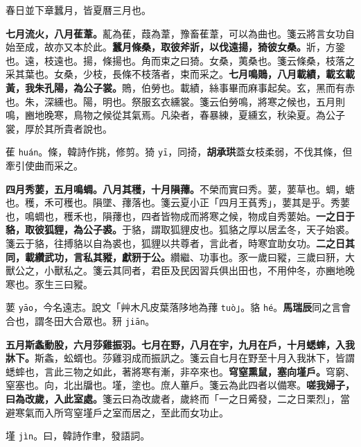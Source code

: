 \begin{quoting}春日並下章蠶月，皆夏曆三月也。\end{quoting}

\textbf{七月流火，八月萑葦。}{\footnotesize 薍為萑，葭為葦，豫畜萑葦，可以為曲也。箋云將言女功自始至成，故亦又本於此。}\textbf{蠶月條桑，取彼斧斨，以伐遠揚，猗彼女桑。}{\footnotesize 斨，方銎也。遠，枝遠也。揚，條揚也。角而束之曰猗。女桑，荑桑也。箋云條桑，枝落之采其葉也。女桑，少枝，長條不枝落者，束而采之。}\textbf{七月鳴鵙，八月載績，載玄載黃，我朱孔陽，為公子裳。}{\footnotesize 鵙，伯勞也。載績，絲事畢而麻事起矣。玄，黑而有赤也。朱，深纁也。陽，明也。祭服玄衣纁裳。箋云伯勞鳴，將寒之候也，五月則鳴，豳地晚寒，鳥物之候從其氣焉。凡染者，春暴練，夏纁玄，秋染夏。為公子裳，厚於其所貴者說也。}

\begin{quoting}萑 \texttt{huán}。條，韓詩作挑，修剪。猗 \texttt{yī}，同掎，\textbf{胡承珙}蓋女枝柔弱，不伐其條，但牽引使曲而采之。\end{quoting}

\textbf{四月秀葽，五月鳴蜩。八月其穫，十月隕蘀。}{\footnotesize 不榮而實曰秀。葽，葽草也。蜩，螗也。穫，禾可穫也。隕墜、蘀落也。箋云夏小正「四月王萯秀」，葽其是乎。秀葽也，鳴蜩也，穫禾也，隕蘀也，四者皆物成而將寒之候，物成自秀葽始。}\textbf{一之日于貉，取彼狐貍，為公子裘。}{\footnotesize 于貉，謂取狐貍皮也。狐貉之厚以居孟冬，天子始裘。箋云于貉，往搏貉以自為裘也，狐貍以共尊者，言此者，時寒宜助女功。}\textbf{二之日其同，載纘武功，言私其豵，獻豜于公。}{\footnotesize 纘繼、功事也。豕一歲曰豵，三歲曰豜，大獸公之，小獸私之。箋云其同者，君臣及民因習兵俱出田也，不用仲冬，亦豳地晚寒也。豕生三曰豵。}

\begin{quoting}葽 \texttt{yāo}，今名遠志。說文「艸木凡皮葉落陊地為蘀 \texttt{tuò}」。貉 \texttt{hé}。\textbf{馬瑞辰}同之言會合也，謂冬田大合眾也。豜 \texttt{jiān}。\end{quoting}

\textbf{五月斯螽動股，六月莎雞振羽。七月在野，八月在宇，九月在戶，十月蟋蟀，入我牀下。}{\footnotesize 斯螽，蚣蝑也。莎雞羽成而振訊之。箋云自七月在野至十月入我牀下，皆謂蟋蟀也，言此三物之如此，著將寒有漸，非卒來也。}\textbf{穹窒熏鼠，塞向墐戶。}{\footnotesize 穹窮、窒塞也。向，北出牖也。墐，塗也。庶人蓽戶。箋云為此四者以備寒。}\textbf{嗟我婦子，曰為改歲，入此室處。}{\footnotesize 箋云曰為改歲者，歲終而「一之日觱發，二之日栗烈」，當避寒氣而入所穹窒墐戶之室而居之，至此而女功止。}

\begin{quoting}墐 \texttt{jìn}。曰，韓詩作聿，發語詞。\end{quoting}

